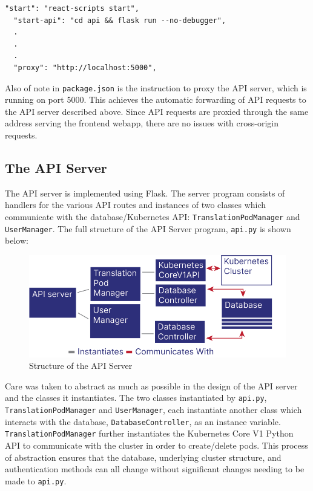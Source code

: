 \documentclass[12pt]{article}
\begin{document}
\begin{lstlisting}[basicstyle=\linespread{0.5}\ttfamily,caption={Frontend/API Server Configuration},captionpos=b]
  "start": "react-scripts start",
  "start-api": "cd api && flask run --no-debugger",
  .
  .
  .
  "proxy": "http://localhost:5000",
\end{lstlisting}

Also of note in \lstinline{package.json} is the instruction to proxy
the API server, which is running on port 5000.  This achieves the
automatic forwarding of API requests to the API server described
above.  Since API requests are proxied through the same address
serving the frontend webapp, there are no issues with cross-origin
requests.

\subsection{The API Server}

The API server is implemented using Flask.  The server program
consists of handlers for the various API routes and instances of two
classes which communicate with the database/Kubernetes API:
\lstinline{TranslationPodManager} and \lstinline{UserManager}.  The
full structure of the API Server program, \lstinline{api.py} is shown
below:

\begin{figure}[h!]

  \includegraphics[scale=1]{api_structure}
  \centering
  \caption{Structure of the API Server}
  \label{rr:detailed}
\end{figure}

Care was taken to abstract as much as possible in the design of the
API server and the classes it instantiates.  The two classes
instantiated by \lstinline{api.py}, \lstinline{TranslationPodManager}
and \lstinline{UserManager}, each instantiate another class which
interacts with the database, \lstinline{DatabaseController}, as an
instance variable.  \lstinline{TranslationPodManager} further
instantiates the Kubernetes Core V1 Python API to communicate with the
cluster in order to create/delete pods.  This process of abstraction
ensures that the database, underlying cluster structure, and
authentication methods can all change without significant changes
needing to be made to \lstinline{api.py}.
\par
\end{document}
